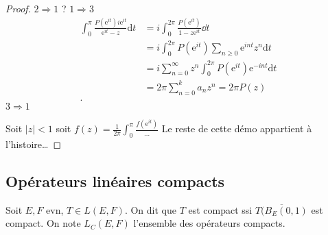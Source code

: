\begin{proof}
	$2\Rightarrow 1$
	?
	$1\Rightarrow 3$
\newcommand\eit{\text{e}^{it}}
	\begin{align*}
		\int_{0}^{\pi} \frac{P\left( \text{e}^{it} \right) i \text{e}^{it}}{\text{e}^{it} -z} \mathrm{d} t &= i \int_{0}^{2\pi} \frac{P\left( \eit \right) }{1 - z \eit} \dd t  \\
		&= i \int_{0}^{2 \pi} P\left( \eit \right) \sum_{n\ge 0} \text{e}^{int} z^n \mathrm{d} t   \\
		&= i \sum_{n=0}^{\infty} z^n \int_{0}^{2 \pi} P\left(  \eit \right) \text{e}^{-int} \mathrm{d} t   \\
		&= 2 \pi \sum_{n=0}^{k} a_n z^n = 2\pi P\left( z \right)  \\
	.\end{align*}
	$3\Rightarrow 1$

	Soit $|z| <1$ soit $f\left( z \right) = \frac{1}{2\pi} \int_{0}^{\pi} \frac{ f\left( \eit \right) }{\ldots}  $
	Le reste de cette démo appartient à l'histoire\ldots
\end{proof}


\subsection{Opérateurs linéaires compacts}
\begin{definition}
    Soit $E,F$ evn, $T\in L(E,F)$. On dit que $T$ est compact ssi $\overline{T(B_E(0,1)}$ est compact. On note $L_C(E,F)$ l'ensemble des opérateurs compacts.
\end{definition}

